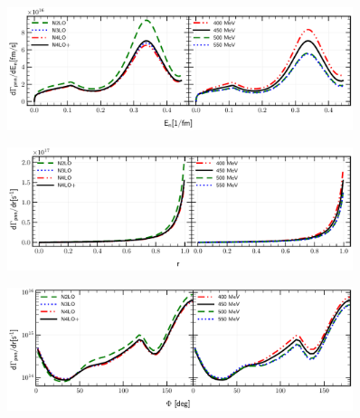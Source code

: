     \begin{figure}[h]
        \begin{center}
        \includegraphics[width=0.9\textwidth]{PlotData/PION/Dalitz_maps/figures/3HE_dGdEn.pdf}
        \end{center}
        \caption{}
        \label{pion_dGdEn}
    \end{figure}

    \begin{figure}[h]
        \begin{center}
        \includegraphics[width=0.9\textwidth]{PlotData/PION/Dalitz_maps/figures/3HE_dGdr.pdf}
        \end{center}
        \caption{}
        \label{pion_dGdEr}
    \end{figure}

    \begin{figure}[h]
        \begin{center}
        \includegraphics[width=0.9\textwidth]{PlotData/PION/Dalitz_maps/figures/3HE_dGdphi.pdf}
        \end{center}
        \caption{}
        \label{pion_dGdphi}
    \end{figure}


